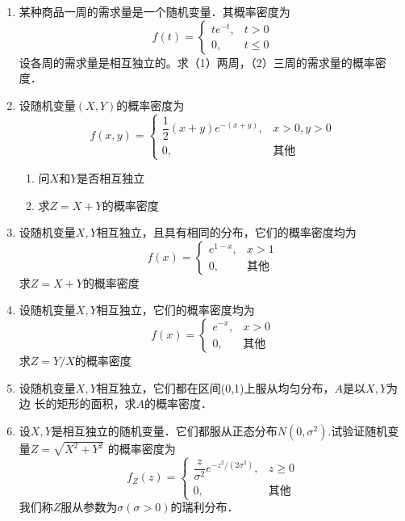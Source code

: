 \documentclass[10pt,a4paper]{article}
\begin{document}
\begin{enumerate}
     
    \item 某种商品一周的需求量是一个随机变量．其概率密度为
    $$f(t)=\left\{\begin{array}{ll}
        te^{-t}, & t>0\\
        0, & t\leq 0 
    \end{array}\right.$$
    设各周的需求量是相互独立的。求（1）两周，（2）三周的需求量的概率密度．


    \item 设随机变量$(X,Y)$的概率密度为
    $$f(x,y)=\left\{\begin{array}{ll}
        \dfrac{1}{2}(x+y)e^{-(x+y)}, & x>0,y>0\\
        0, & \mbox{其他}
    \end{array}\right.$$
    \begin{enumerate}
        \item 问$X$和$Y$是否相互独立
        \item 求$Z=X+Y$的概率密度
    \end{enumerate}


    \item 设随机变量$X,Y$相互独立，且具有相同的分布，它们的概率密度均为
    $$f(x)=\left\{\begin{array}{ll}
        e^{1-x}, & x>1\\
        0, & \mbox{其他}
    \end{array}\right.$$
    求$Z=X+Y$的概率密度


    \item 设随机变量$X,Y$相互独立，它们的概率密度均为
    $$f(x)=\left\{\begin{array}{ll}
        e^{-x}, & x>0\\
        0, & \mbox{其他}
    \end{array}\right.$$
    求$Z=Y/X$的概率密度


    \item 设随机变量$X,Y$相互独立，它们都在区间(0,1)上服从均匀分布，$A$是以$X,Y$为边
    长的矩形的面积，求$A$的概率密度．


    \item 设$X,Y$是相互独立的随机变量．它们都服从正态分布$N(0,\sigma^2)$.试验证随机变量$Z=\sqrt{X^2+Y^2}$
    的概率密度为
    $$f_Z(z)=\left\{\begin{array}{ll}
        \dfrac{z}{\sigma^2}e^{-z^2/(2\sigma^2)}, & z\geq 0\\
        0, & \mbox{其他}
    \end{array}\right.$$
    我们称$Z$服从参数为$\sigma(\sigma>0)$的瑞利分布．




\end{enumerate}
\end{document}
